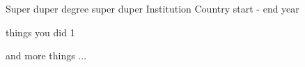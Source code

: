 

\begin{cventries}

  \cventry
    {Super duper degree} %
    {super duper Institution} %
    {Country} %
    {start - end year} %
    {
      \begin{cvitems} %
        \item {things you did 1}
        \item {and more things ...}
      \end{cvitems}
    }

\end{cventries}
